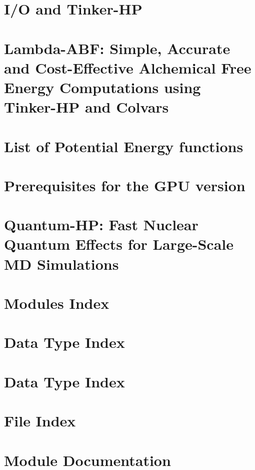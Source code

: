 \documentclass[twoside]{book}
\begin{document}
\chapter{I/\-O and Tinker-\/\-H\-P }
\label{md_io_doxygen}
\hypertarget{md_io_doxygen}{}

\chapter{Lambda-\/\-A\-B\-F\-: Simple, Accurate and Cost-\/\-Effective Alchemical Free Energy Computations using Tinker-\/\-H\-P and Colvars}
\label{md_lambda-abf_doxygen}
\hypertarget{md_lambda-abf_doxygen}{}

\chapter{List of Potential Energy functions}
\label{md_potential_doxygen}
\hypertarget{md_potential_doxygen}{}

\chapter{Prerequisites for the G\-P\-U version}
\label{md_Prerequisites_doxygen}
\hypertarget{md_Prerequisites_doxygen}{}

\chapter{Quantum-\/\-H\-P\-: Fast Nuclear Quantum Effects for Large-\/\-Scale M\-D Simulations}
\label{md_Quantum-HP_doxygen}
\hypertarget{md_Quantum-HP_doxygen}{}

\chapter{Modules Index}

\chapter{Data Type Index}

\chapter{Data Type Index}

\chapter{File Index}

\chapter{Module Documentation}

\end{document}
